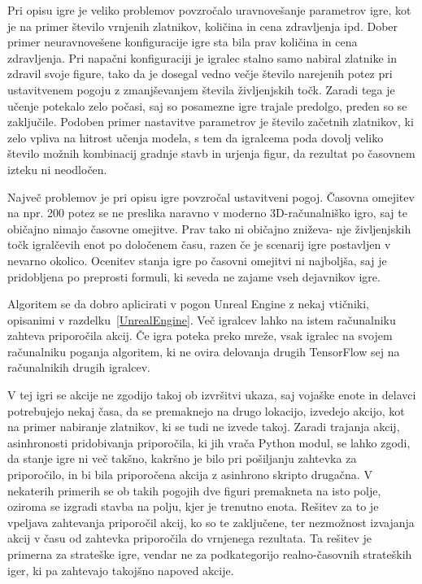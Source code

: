 \documentclass[a4paper, 12pt]{book}
\begin{document}
{Pri opisu igre je veliko problemov povzročalo uravnovešanje parametrov igre, kot je na primer število vrnjenih zlatnikov, količina in cena zdravljenja ipd.
Dober primer neuravnovešene konfiguracije igre sta bila prav količina in cena zdravljenja.
Pri napačni konfiguraciji je igralec stalno samo nabiral zlatnike in zdravil svoje figure, tako da je dosegal vedno večje število narejenih potez pri ustavitvenem pogoju z zmanjševanjem števila življenjskih točk.
Zaradi tega je učenje potekalo zelo počasi, saj so posamezne igre trajale predolgo, preden so se zaključile.
Podoben primer nastavitve parametrov je število začetnih zlatnikov, ki zelo vpliva na hitrost učenja modela, s tem da igralcema poda dovolj veliko število možnih kombinacij gradnje stavb in urjenja figur, da rezultat po časovnem izteku ni neodločen.

Največ problemov je pri opisu igre povzročal ustavitveni pogoj.
Časovna omejitev na npr. 200 potez se ne preslika naravno v moderno 3D-računalniško igro, saj te običajno nimajo časovne omejitve.
Prav tako ni običajno zniževa- nje življenjskih točk igralčevih enot po določenem času, razen če je scenarij igre postavljen v nevarno okolico.
Ocenitev stanja igre po časovni omejitvi ni najboljša, saj je pridobljena po preprosti formuli, ki seveda ne zajame vseh dejavnikov igre.

Algoritem se da dobro aplicirati v pogon Unreal Engine z nekaj vtičniki, opisanimi v razdelku~\ref{UnrealEngine}. Več igralcev lahko na istem računalniku zahteva priporočila akcij. 
Če igra poteka preko mreže, vsak igralec na svojem računalniku poganja algoritem, ki ne ovira delovanja drugih TensorFlow sej na računalnikih drugih igralcev.

V tej igri se akcije ne zgodijo takoj ob izvršitvi ukaza, saj vojaške enote in delavci potrebujejo nekaj časa, da se premaknejo na drugo lokacijo, izvedejo akcijo, kot na primer nabiranje zlatnikov, ki se tudi ne izvede takoj.
Zaradi trajanja akcij, asinhronosti pridobivanja priporočila, ki jih vrača Python modul, se lahko zgodi, da stanje igre ni več takšno, kakršno je bilo pri pošiljanju zahtevka za priporočilo, in bi bila priporočena akcija z asinhrono skripto drugačna. 
V nekaterih primerih se ob takih pogojih dve figuri premakneta na isto polje, oziroma se izgradi stavba na polju, kjer je trenutno enota. 
Rešitev za to je vpeljava zahtevanja priporočil akcij, ko so te zaključene, ter nezmožnost izvajanja akcij v času od zahtevka priporočila do vrnjenega rezultata.
Ta rešitev je primerna za strateške igre, vendar ne za podkategorijo realno-časovnih strateških iger, ki pa zahtevajo takojšno napoved akcije.

}
\end{document}
